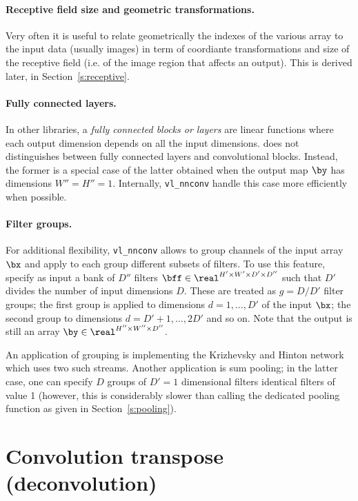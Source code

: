 \paragraph{Receptive field size and geometric transformations.} Very often it is useful to relate geometrically the indexes of the various array to the input data (usually images) in term of coordiante transformations and size of the receptive field (i.e. of the image region that affects an output). This is derived later, in Section~\ref{s:receptive}.

\paragraph{Fully connected layers.} In other libraries, a \emph{fully connected blocks or layers} are linear functions where each output dimension depends on all the input dimensions. \vlnn does not distinguishes between fully connected layers and convolutional blocks. Instead, the former is a special case of the latter obtained when the output map $\by$ has dimensions $W''=H''=1$. Internally, \verb!vl_nnconv! handle this case more efficiently when possible.

\paragraph{Filter groups.} For additional flexibility, \verb!vl_nnconv! allows to group channels of the input array $\bx$ and apply to each group different subsets of filters. To use this feature, specify as input a bank  of $D''$ filters $\bff\in\real^{H'\times W'\times D'\times D''}$ such that $D'$ divides the number of input dimensions $D$. These are treated as $g=D/D'$ filter groups; the first group is applied to dimensions $d=1,\dots,D'$ of the input $\bx$; the second group to dimensions $d=D'+1,\dots,2D'$ and so on. Note that the output is still an array $\by\in\real^{H''\times W''\times D''}$.

An application of grouping is implementing the Krizhevsky and Hinton network~\cite{krizhevsky12imagenet} which uses two such streams. Another application is sum pooling; in the latter case, one can specify $D$ groups of $D'=1$ dimensional filters identical filters of value 1 (however, this is considerably slower than calling the dedicated pooling function as given in Section~\ref{s:pooling}).

\section{Convolution transpose (deconvolution)}\label{s:convt}

